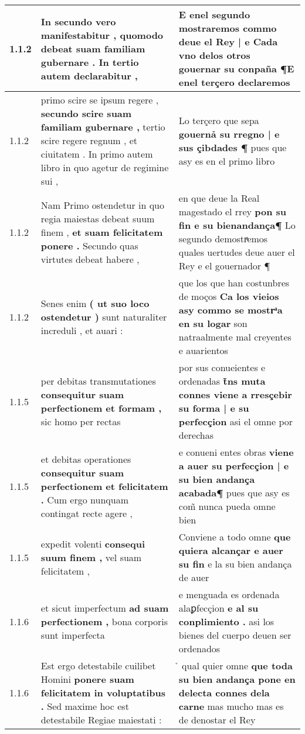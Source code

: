 \begin{tabular}{|p{1cm}|p{6.5cm}|p{6.5cm}|}

\hline
1.1.2 & In secundo vero manifestabitur , \textbf{ quomodo debeat suam familiam gubernare . } In tertio autem declarabitur , & E enel segundo mostraremos \textbf{ commo deue el Rey | e Cada vno delos otros gouernar su conpaña } ¶E enel terçero declaremos \\\hline
1.1.2 & primo scire se ipsum regere , \textbf{ secundo scire suam familiam gubernare , } tertio scire regere regnum , et ciuitatem . In primo autem libro in quo agetur de regimine sui , & Lo terçero que sepa \textbf{ gouernả su rregno | e sus çibdades ¶ } pues que asy es en el primo libro \\\hline
1.1.2 & Nam Primo ostendetur in quo regia maiestas debeat suum finem , \textbf{ et suam felicitatem ponere . } Secundo quas virtutes debeat habere , & en que deue la Real magestado el rrey \textbf{ pon su fin e su bienandança¶ } Lo segundo demostrͣemos quales uertudes deue auer el Rey e el gouernador ¶ \\\hline
1.1.2 & Senes enim \textbf{ ( ut suo loco ostendetur ) } sunt naturaliter increduli , et auari : & que los que han costunbres de moços \textbf{ Ca los vieios asy commo se mostrͣa en su logar } son natraalmente mal creyentes e auarientos \\\hline
1.1.5 & per debitas transmutationes \textbf{ consequitur suam perfectionem et formam , } sic homo per rectas & por sus conueientes e ordenadas \textbf{ t̃ns muta connes viene a rresçebir su forma | e su perfecçion } asi el omne por derechas \\\hline
1.1.5 & et debitas operationes \textbf{ consequitur suam perfectionem et felicitatem . } Cum ergo nunquam contingat recte agere , & e conueni entes obras \textbf{ viene a auer su perfecçion | e su bien andança acabada¶ } pues que asy es com̃ nunca pueda omne bien \\\hline
1.1.5 & expedit volenti \textbf{ consequi suum finem , } vel suam felicitatem , & Conviene a todo omne \textbf{ que quiera alcançar e auer su fin } e la su bien andança de auer \\\hline
1.1.6 & et sicut imperfectum \textbf{ ad suam perfectionem , } bona corporis sunt imperfecta & e menguada es ordenada alaꝑfecçion \textbf{ e al su conplimiento . } asi los bienes del cuerpo deuen ser ordenados \\\hline
1.1.6 & Est ergo detestabile cuilibet Homini \textbf{ ponere suam felicitatem in voluptatibus . } Sed maxime hoc est detestabile Regiae maiestati : & ̉ qual quier omne \textbf{ que toda su bien andança pone en delecta connes dela carne } mas mucho mas es de denostar el Rey \\\hline

\end{tabular}
